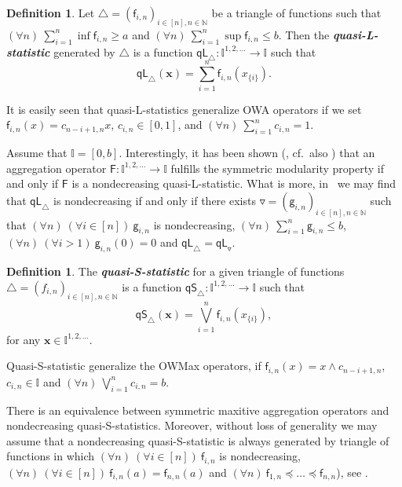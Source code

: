 \documentclass[11pt]{article}\usepackage[]{graphicx}\usepackage[]{color}
\renewcommand{\emph}[1]{\textbf{\textsl{#1}}}
\newcommand{\vect}[1]{{\mathbf{#1}}}
\newcommand{\func}[1]{{\mathsf{#1}}}
\newcommand{\Naturals}{\mathbb{N}}
\newcommand{\Ival}{\mathbb{I}}
\newcommand{\AnyPow}{^{1,2,\dots}}
\newcommand{\IvalAnyPow}{\mathbb{I}\AnyPow}
\theoremstyle{remark}
\theoremstyle{definition}
\newtheorem{definition}[theorem]{Definition}
\begin{document}
\medskip
\begin{definition}
Let $\triangle=(\func{f}_{i,n})_{ i\in [n],n\in\Naturals}$ be a triangle of functions
such that $(\forall n)\ \sum_{i=1}^{n}\inf{\func{f}_{i,n}}\geq a$ and
$(\forall n)\ \sum_{i=1}^{n}\sup{\func{f}_{i,n}}\leq b$. Then  the
\emph{quasi-L-statistic} generated by $\triangle$
is a function $\func{qL}_{\triangle}:\IvalAnyPow\to\Ival$ such that
\[
\func{qL}_{\triangle}(\vect{x})=\sum_{i=1}^{n}\func{f}_{i,n}(x_{\{i\}}).
\]
\end{definition}
\bigskip

It is easily seen that quasi-L-statistics generalize OWA operators
if we set $\func{f}_{i,n}(x)=c_{n-i+1,n} x$, $c_{i,n}\in[0,1]$, and
$(\forall n)\ \sum_{i=1}^{n}c_{i,n}=1$.

Assume that $\Ival=[0,b]$.
Interestingly, it has been shown (\cite{MesiarMesiarova2011:OMA},
cf.~also \cite{Gagolewski2013:om3})
that an aggregation
operator $\func{F}:\IvalAnyPow\to\Ival$ fulfills the
symmetric modularity property if and only if
$\func{F}$ is a nondecreasing quasi-L-statistic.
What is more, in~\cite{Gagolewski2013:om3}
we may find that $\func{qL}_{\triangle}$ is nondecreasing
if and only if there exists $\triangledown=(\func{g}_{i,n})_{i\in[n],n\in\Naturals}$
such that
$(\forall n)\ (\forall i\in[n])\ \func{g}_{i,n}$ is nondecreasing,
$(\forall n)\ \sum_{i=1}^{n}\func{g}_{i,n}\leq b$,
$(\forall n)\ (\forall i>1)\ \func{g}_{i,n}(0)=0$ and
$\func{qL}_{\triangle}=\func{qL}_{\triangledown}$.


\bigskip
\begin{definition}
The \emph{quasi-S-statistic} for a given triangle of functions
$\triangle=(f_{i,n})_{ i\in [n],n\in\Naturals}$
is a function $\func{qS}_{\triangle}:\IvalAnyPow\to\Ival$ such that
\[
\func{qS}_{\triangle}(\vect{x})=\bigvee_{i=1}^{n}\func{f}_{i,n}(x_{\{i\}}),
\] for any $\vect{x}\in\IvalAnyPow$.
\end{definition}
\bigskip

Quasi-S-statistic generalize the OWMax operators,
if $\func{f}_{i,n}(x)=x\wedge c_{n-i+1,n}$, $c_{i,n}\in\Ival$
and $(\forall n)\ \bigvee_{i=1}^{n}c_{i,n}=b$.

There is an equivalence between symmetric maxitive
aggregation operators and nondecreasing quasi-S-statistics.
Moreover, without loss of generality
we may assume that a nondecreasing quasi-S-statistic
is always generated by triangle of functions
in which $(\forall n)\ (\forall i\in[n])\ \func{f}_{i,n}$ is nondecreasing,
$(\forall n)\ (\forall i\in[n])\ \func{f}_{i,n}(a)=\func{f}_{n,n}(a)$
and $(\forall n)\ \func{f}_{1,n}\preceq\dots\preceq\func{f}_{n,n}$),
see \cite{Gagolewski2013:om3}.
\end{document}
